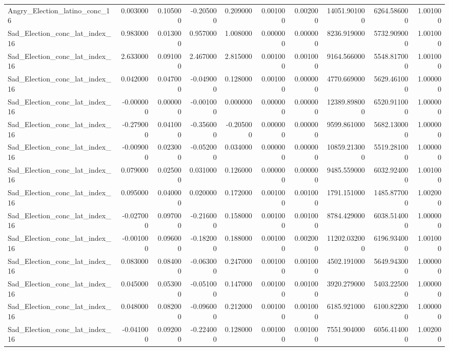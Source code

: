 \begin{table}
\begin{tabular}{lrrrrrrrrr}
Angry_Election_latino_conc_16 & 0.003000 & 0.105000 & -0.205000 & 0.209000 & 0.001000 & 0.002000 & 14051.901000 & 6264.586000 & 1.001000 \\
Sad_Election_conc_lat_index_16 & 0.983000 & 0.013000 & 0.957000 & 1.008000 & 0.000000 & 0.000000 & 8236.919000 & 5732.909000 & 1.001000 \\
Sad_Election_conc_lat_index_16 & 2.633000 & 0.091000 & 2.467000 & 2.815000 & 0.001000 & 0.001000 & 9164.566000 & 5548.817000 & 1.001000 \\
Sad_Election_conc_lat_index_16 & 0.042000 & 0.047000 & -0.049000 & 0.128000 & 0.001000 & 0.000000 & 4770.669000 & 5629.461000 & 1.000000 \\
Sad_Election_conc_lat_index_16 & -0.000000 & 0.000000 & -0.001000 & 0.000000 & 0.000000 & 0.000000 & 12389.898000 & 6520.911000 & 1.000000 \\
Sad_Election_conc_lat_index_16 & -0.279000 & 0.041000 & -0.356000 & -0.205000 & 0.000000 & 0.000000 & 9599.861000 & 5682.130000 & 1.000000 \\
Sad_Election_conc_lat_index_16 & -0.009000 & 0.023000 & -0.052000 & 0.034000 & 0.000000 & 0.000000 & 10859.213000 & 5519.281000 & 1.000000 \\
Sad_Election_conc_lat_index_16 & 0.079000 & 0.025000 & 0.031000 & 0.126000 & 0.000000 & 0.000000 & 9485.559000 & 6032.924000 & 1.001000 \\
Sad_Election_conc_lat_index_16 & 0.095000 & 0.040000 & 0.020000 & 0.172000 & 0.001000 & 0.001000 & 1791.151000 & 1485.877000 & 1.002000 \\
Sad_Election_conc_lat_index_16 & -0.027000 & 0.097000 & -0.216000 & 0.158000 & 0.001000 & 0.001000 & 8784.429000 & 6038.514000 & 1.000000 \\
Sad_Election_conc_lat_index_16 & -0.001000 & 0.096000 & -0.182000 & 0.188000 & 0.001000 & 0.002000 & 11202.032000 & 6196.934000 & 1.001000 \\
Sad_Election_conc_lat_index_16 & 0.083000 & 0.084000 & -0.063000 & 0.247000 & 0.001000 & 0.001000 & 4502.191000 & 5649.943000 & 1.000000 \\
Sad_Election_conc_lat_index_16 & 0.045000 & 0.053000 & -0.051000 & 0.147000 & 0.001000 & 0.001000 & 3920.279000 & 5403.225000 & 1.000000 \\
Sad_Election_conc_lat_index_16 & 0.048000 & 0.082000 & -0.096000 & 0.212000 & 0.001000 & 0.001000 & 6185.921000 & 6100.822000 & 1.000000 \\
Sad_Election_conc_lat_index_16 & -0.041000 & 0.092000 & -0.224000 & 0.128000 & 0.001000 & 0.001000 & 7551.904000 & 6056.414000 & 1.002000 \\

\end{tabular}
\end{table}
